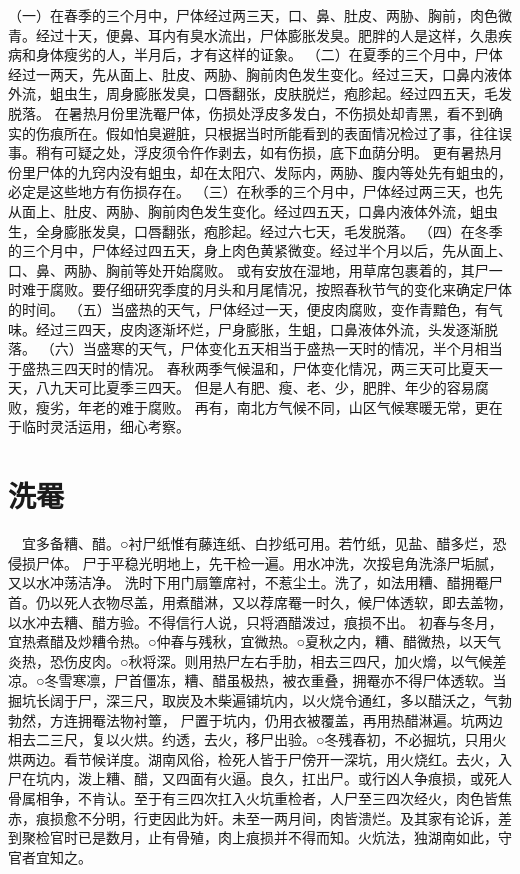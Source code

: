 \documentclass[12pt,UTF8]{ctexbook}
\begin{document}
（一）在春季的三个月中，尸体经过两三天，口、鼻、肚皮、两胁、胸前，肉色微青。经过十天，便鼻、耳内有臭水流出，尸体膨胀发臭。肥胖的人是这样，久患疾病和身体瘦劣的人，半月后，才有这样的证象。
（二）在夏季的三个月中，尸体经过一两天，先从面上、肚皮、两胁、胸前肉色发生变化。经过三天，口鼻内液体外流，蛆虫生，周身膨胀发臭，口唇翻张，皮肤脱烂，疱胗起。经过四五天，毛发脱落。
在暑热月份里洗罨尸体，伤损处浮皮多发白，不伤损处却青黑，看不到确实的伤痕所在。假如怕臭避脏，只根据当时所能看到的表面情况检过了事，往往误事。稍有可疑之处，浮皮须令仵作剥去，如有伤损，底下血荫分明。
更有暑热月份里尸体的九窍内没有蛆虫，却在太阳穴、发际内，两胁、腹内等处先有蛆虫的，必定是这些地方有伤损存在。
（三）在秋季的三个月中，尸体经过两三天，也先从面上、肚皮、两胁、胸前肉色发生变化。经过四五天，口鼻内液体外流，蛆虫生，全身膨胀发臭，口唇翻张，疱胗起。经过六七天，毛发脱落。
（四）在冬季的三个月中，尸体经过四五天，身上肉色黄紧微变。经过半个月以后，先从面上、口、鼻、两胁、胸前等处开始腐败。
或有安放在湿地，用草席包裹着的，其尸一时难于腐败。要仔细研究季度的月头和月尾情况，按照春秋节气的变化来确定尸体的时间。
（五）当盛热的天气，尸体经过一天，便皮肉腐败，变作青黯色，有气味。经过三四天，皮肉逐渐坏烂，尸身膨胀，生蛆，口鼻液体外流，头发逐渐脱落。
（六）当盛寒的天气，尸体变化五天相当于盛热一天时的情况，半个月相当于盛热三四天时的情况。
春秋两季气候温和，尸体变化情况，两三天可比夏天一天，八九天可比夏季三四天。
但是人有肥、瘦、老、少，肥胖、年少的容易腐败，瘦劣，年老的难于腐败。
再有，南北方气候不同，山区气候寒暖无常，更在于临时灵活运用，细心考察。


\chapter{洗罨}

　宜多备糟、醋。○衬尸纸惟有藤连纸、白抄纸可用。若竹纸，见盐、醋多烂，恐侵损尸体。
尸于平稳光明地上，先干检一遍。用水冲洗，次挼皂角洗涤尸垢腻，又以水冲荡洁净。
洗时下用门扇簟席衬，不惹尘土。洗了，如法用糟、醋拥罨尸首。仍以死人衣物尽盖，用煮醋淋，又以荐席罨一时久，候尸体透软，即去盖物，以水冲去糟、醋方验。不得信行人说，只将酒醋泼过，痕损不出。
初春与冬月，宜热煮醋及炒糟令热。○仲春与残秋，宜微热。○夏秋之内，糟、醋微热，以天气炎热，恐伤皮肉。○秋将深。则用热尸左右手肋，相去三四尺，加火熁，以气候差凉。○冬雪寒凛，尸首僵冻，糟、醋虽极热，被衣重叠，拥罨亦不得尸体透软。当掘坑长阔于尸，深三尺，取炭及木柴遍铺坑内，以火烧令通红，多以醋沃之，气勃勃然，方连拥罨法物衬簟， 尸置于坑内，仍用衣被覆盖，再用热醋淋遍。坑两边相去二三尺，复以火烘。约透，去火，移尸出验。○冬残春初，不必掘坑，只用火烘两边。看节候详度。湖南风俗，检死人皆于尸傍开一深坑，用火烧红。去火，入尸在坑内，泼上糟、醋，又四面有火逼。良久，扛出尸。或行凶人争痕损，或死人骨属相争，不肯认。至于有三四次扛入火坑重检者，人尸至三四次经火，肉色皆焦赤，痕损愈不分明，行吏因此为奸。未至一两月间，肉皆溃烂。及其家有论诉，差到聚检官时已是数月，止有骨殖，肉上痕损并不得而知。火炕法，独湖南如此，守官者宜知之。
\end{document}
